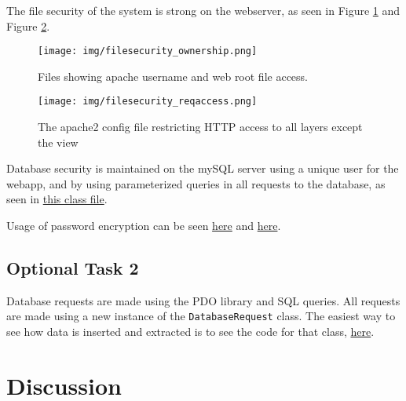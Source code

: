 \documentclass[a4paper]{scrreprt}
\newcommand{\code}[1]{\texttt{#1}}
\begin{document}
The file security of the system is strong on the webserver, as seen in Figure \ref{fig:ownership} and Figure \ref{fig:reqaccess}.

\begin{figure}[h!]
  \begin{center}
    \texttt{[image: img/filesecurity\_ownership.png]}
    \caption{Files showing apache username and web root file access.}
    \label{fig:ownership}
  \end{center}
\end{figure}

\begin{figure}[h!]
  \begin{center}
    \texttt{[image: img/filesecurity\_reqaccess.png]}
    \caption{The apache2 config file restricting HTTP access to all layers except the view}
    \label{fig:reqaccess}
  \end{center}
\end{figure}

Database security is maintained on the mySQL server using a unique user for the webapp, and by using parameterized queries in all requests to the database, as seen in \href{https://github.com/fongie/TastyRecipes/blob/assignment3/src/integration/DatabaseRequest.php}{this class file}.

Usage of password encryption can be seen \href{https://github.com/fongie/TastyRecipes/blob/86f4548c3b4659b762134c756cc5ac4c0cbf72a2/src/model/UserAccountHandler.php#L35}{here} and \href{https://github.com/fongie/TastyRecipes/blob/86f4548c3b4659b762134c756cc5ac4c0cbf72a2/src/model/UserAccountHandler.php#L18}{here}.

\section{Optional Task 2}

Database requests are made using the PDO library and SQL queries. All requests are made using a new instance of the \code{DatabaseRequest} class. The easiest way to see how data is inserted and extracted is to see the code for that class, \href{https://github.com/fongie/TastyRecipes/blob/assignment3/src/integration/DatabaseRequest.php}{here}.

\chapter{Discussion}
\end{document}

